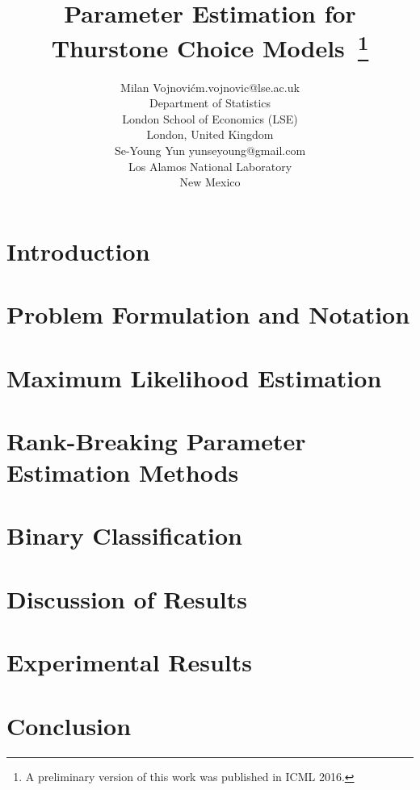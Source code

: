 \documentclass[twoside,11pt]{article}
\begin{document}
\title{Parameter Estimation for Thurstone Choice Models~\thanks{A preliminary version of this work was published in ICML 2016.}}

\author{\name Milan Vojnovi\' c\email m.vojnovic@lse.ac.uk\\
       \addr Department of Statistics\\
			 London School of Economics (LSE)\\
       London, United Kingdom\\
       \AND
       \name Se-Young Yun \email yunseyoung@gmail.com\\
       \addr Los Alamos National Laboratory\\
       New Mexico
			}



\maketitle

\begin{abstract} 
      
\end{abstract} 

\section{Introduction}
\label{intro}



\section{Problem Formulation and Notation}
\label{sec:defs}


\section{Maximum Likelihood Estimation}
\label{sec:mse}


\section{Rank-Breaking Parameter Estimation Methods}
\label{sec:rankbreaking}


\section{Binary Classification}
\label{sec:classy}


\section{Discussion of Results}
\label{sec:disc}


\section{Experimental Results}
\label{sec:exp}


\section{Conclusion}
\label{sec:conc}




\newpage

\end{document}
